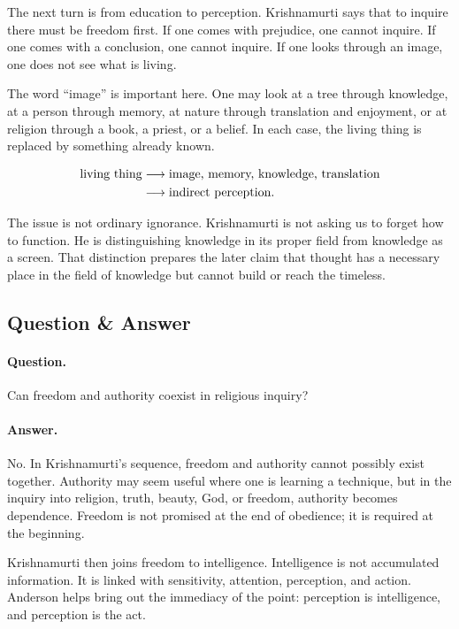 The next turn is from education to perception. Krishnamurti says that to inquire there must be freedom first. If one comes with prejudice, one cannot inquire. If one comes with a conclusion, one cannot inquire. If one looks through an image, one does not see what is living.

The word ``image'' is important here. One may look at a tree through knowledge, at a person through memory, at nature through translation and enjoyment, or at religion through a book, a priest, or a belief. In each case, the living thing is replaced by something already known.

\begin{align}
\hbox{living thing}
&\longrightarrow \hbox{image, memory, knowledge, translation}\\
&\longrightarrow \hbox{indirect perception}.
\end{align}

The issue is not ordinary ignorance. Krishnamurti is not asking us to forget how to function. He is distinguishing knowledge in its proper field from knowledge as a screen. That distinction prepares the later claim that thought has a necessary place in the field of knowledge but cannot build or reach the timeless.

\subsection{Question \& Answer}

\paragraph{Question.}
Can freedom and authority coexist in religious inquiry?

\paragraph{Answer.}
No. In Krishnamurti's sequence, freedom and authority cannot possibly exist together. Authority may seem useful where one is learning a technique, but in the inquiry into religion, truth, beauty, God, or freedom, authority becomes dependence. Freedom is not promised at the end of obedience; it is required at the beginning.

Krishnamurti then joins freedom to intelligence. Intelligence is not accumulated information. It is linked with sensitivity, attention, perception, and action. Anderson helps bring out the immediacy of the point: perception is intelligence, and perception is the act.

